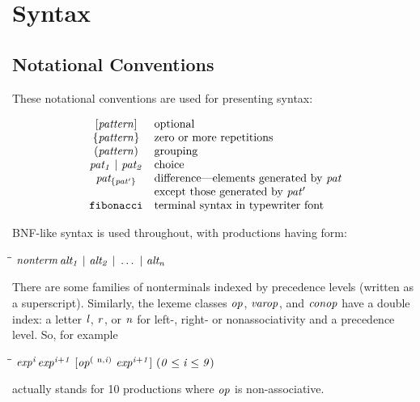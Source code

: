%
%
\section{Syntax}
\label{syntax}

\subsection{Notational Conventions}

These notational conventions are used for presenting syntax:

\[\ba{cl}
\mbox{$\it [pattern]$}             & \tr{optional} \\
\mbox{$\it \{pattern\}$}           & \tr{zero or more repetitions} \\
\mbox{$\it (pattern)$}             & \tr{grouping} \\
\mbox{$\it pat_1\ |\ pat_2$}         & \tr{choice} \\
\mbox{$\it pat_{\{pat'\}}$}        & \tr{difference---elements generated by \mbox{$\it pat$}} \\
                        & \tr{except those generated by \mbox{$\it pat'$}} \\
\mbox{$\it \makebox{\tt fibonacci}$}           & \tr{terminal syntax in typewriter font}
\ea\]

BNF-like syntax is used throughout, with productions having form:
\begin{flushleft}\it\begin{tabbing}
\hspace{0.5in}\=\hspace{3.0in}\=\kill
$\it nonterm$\>\makebox[3.5em]{$\rightarrow$}$\it alt_1\ |\ alt_2\ |\ \ldots \ |\ alt_n$
\end{tabbing}\end{flushleft}

There are some families of nonterminals indexed by
precedence levels (written as a superscript).  Similarly, the
lexeme classes \mbox{$\it op$}, \mbox{$\it varop$}, and \mbox{$\it conop$} have a double index:  a letter \mbox{$\it l$},
\mbox{$\it r$}, or \mbox{$\it n$} for left-, right- or nonassociativity and a precedence
level.  So, for example
\begin{flushleft}\it\begin{tabbing}
\hspace{0.5in}\=\hspace{3.0in}\=\kill
$\it exp^i$\>\makebox[3.5em]{$\rightarrow$}$\it exp^{i+1}\ [op^{({\rm\ n},i)}\ exp^{i+1}]\ (0\leq i\leq 9)$
\end{tabbing}\end{flushleft}
actually stands for 10 productions where \mbox{$\it op$} is non-associative.

